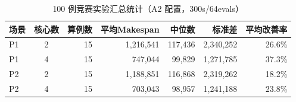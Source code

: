 \begin{table}[!h]
\centering
\caption{100 例竞赛实验汇总统计（A2 配置，300s/64evals）}
\label{tab:competition_summary}
\small
\begin{tabular}{l c rrrr r}
\toprule
\textbf{场景} & \textbf{核心数} & \textbf{算例数} & \textbf{平均Makespan} & \textbf{中位数} & \textbf{标准差} & \textbf{平均改善率} \\
\midrule
P1 & 2 & 15 & 1,216,541 & 117,436 & 2,340,252 & 26.6\% \\
P1 & 4 & 15 & 747,044 & 99,829 & 1,271,785 & 37.3\% \\
P2 & 2 & 15 & 1,188,851 & 116,868 & 2,319,262 & 18.2\% \\
P2 & 4 & 15 & 703,043 & 98,957 & 1,241,188 & 23.8\% \\
\bottomrule
\end{tabular}
\end{table}